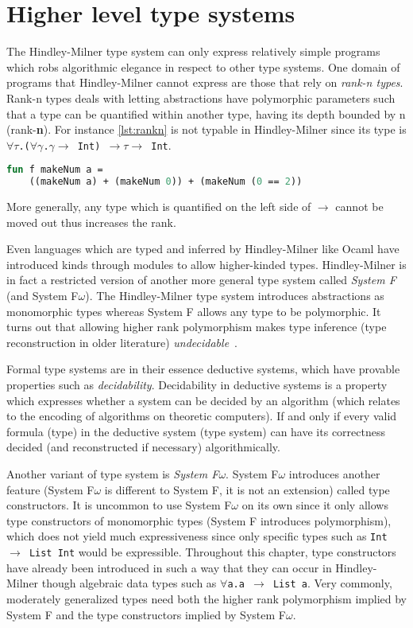 \documentclass[11pt,oneside,a4paper]{report}
\begin{document}
\section{Higher level type systems}
The Hindley-Milner type system can only express relatively simple programs which robs algorithmic elegance in respect to other type systems.
One domain of programs that Hindley-Milner cannot express are those that rely on \textit{rank-n types}.
Rank-n types deals with letting abstractions have polymorphic parameters such that a type can be quantified within another type, having its depth bounded by n (rank-\textbf{n}).
For instance \autoref{lst:rankn} is not typable in Hindley-Milner since its type is \texttt{$\forall\tau$.($\forall\gamma$.$\gamma \rightarrow$ Int) $\rightarrow \tau \rightarrow$ Int}.
\begin{lstlisting}[language=ML,caption={Program that requires rank-n types},label={lst:rankn},mathescape=true]
fun f makeNum a =
    ((makeNum a) + (makeNum 0)) + (makeNum (0 == 2))
\end{lstlisting}
More generally, any type which is quantified on the left side of $\rightarrow$ cannot be moved out thus increases the rank.

Even languages which are typed and inferred by Hindley-Milner like Ocaml have introduced kinds through modules to allow higher-kinded types.
Hindley-Milner is in fact a restricted version of another more general type system called \textit{System F} (and System F\underline{$\omega$}).
The Hindley-Milner type system introduces abstractions as monomorphic types whereas System F allows any type to be polymorphic.
It turns out that allowing higher rank polymorphism makes type inference (type reconstruction in older literature) \textit{undecidable}~\cite{wells1999typability}.
\begin{remark}
    Formal type systems are in their essence deductive systems, which have provable properties such as \textit{decidability}.
    Decidability in deductive systems is a property which expresses whether a system can be decided by an algorithm (which relates to the encoding of algorithms on theoretic computers).
    If and only if every valid formula (type) in the deductive system (type system) can have its correctness decided (and reconstructed if necessary) algorithmically.
\end{remark}

Another variant of type system is \textit{System F\underline{$\omega$}}.
System F\underline{$\omega$} introduces another feature (System F\underline{$\omega$} is different to System F, it is not an extension) called type constructors.
It is uncommon to use System F\underline{$\omega$} on its own since it only allows type constructors of monomorphic types (System F introduces polymorphism), which does not yield much expressiveness since only specific types such as \texttt{Int $\rightarrow$ List Int} would be expressible.
Throughout this chapter, type constructors have already been introduced in such a way that they can occur in Hindley-Milner though algebraic data types such as \texttt{$\forall$a.a $\rightarrow$ List a}.
Very commonly, moderately generalized types need both the higher rank polymorphism implied by System F and the type constructors implied by System F\underline{$\omega$}.
\end{document}
